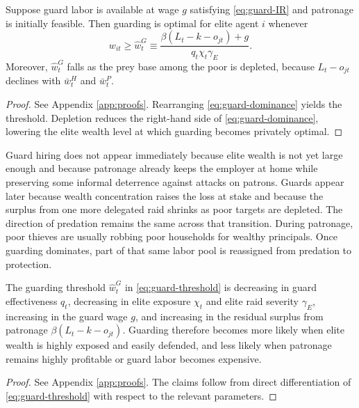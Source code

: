 \begin{theorem}
\label{thm:guarding}
Suppose guard labor is available at wage $g$ satisfying \eqref{eq:guard-IR} and patronage is initially feasible. Then guarding is optimal for elite agent $i$ whenever
\begin{equation}
w_{it} \ge \widehat{w}^{G}_t \equiv \frac{\beta\left(L_t - k - o_{jt}\right) + g}{q_t \chi_t \gamma_E}.
\label{eq:guard-threshold}
\end{equation}
Moreover, $\widehat{w}^{G}_t$ falls as the prey base among the poor is depleted, because $L_t - o_{jt}$ declines with $\bar{w}^{H}_t$ and $\bar{w}^{P}_t$.
\end{theorem}

\begin{proof}
See Appendix \ref{app:proofs}. Rearranging \eqref{eq:guard-dominance} yields the threshold. Depletion reduces the right-hand side of \eqref{eq:guard-dominance}, lowering the elite wealth level at which guarding becomes privately optimal.
\end{proof}

Guard hiring does not appear immediately because elite wealth is not yet large enough and because patronage already keeps the employer at home while preserving some informal deterrence against attacks on patrons. Guards appear later because wealth concentration raises the loss at stake and because the surplus from one more delegated raid shrinks as poor targets are depleted. The direction of predation remains the same across that transition. During patronage, poor thieves are usually robbing poor households for wealthy principals. Once guarding dominates, part of that same labor pool is reassigned from predation to protection.

\begin{corollary}
\label{cor:guard-statics}
The guarding threshold $\widehat{w}^{G}_t$ in \eqref{eq:guard-threshold} is decreasing in guard effectiveness $q_t$, decreasing in elite exposure $\chi_t$ and elite raid severity $\gamma_E$, increasing in the guard wage $g$, and increasing in the residual surplus from patronage $\beta(L_t-k-o_{jt})$. Guarding therefore becomes more likely when elite wealth is highly exposed and easily defended, and less likely when patronage remains highly profitable or guard labor becomes expensive.
\end{corollary}

\begin{proof}
See Appendix \ref{app:proofs}. The claims follow from direct differentiation of \eqref{eq:guard-threshold} with respect to the relevant parameters.
\end{proof}


